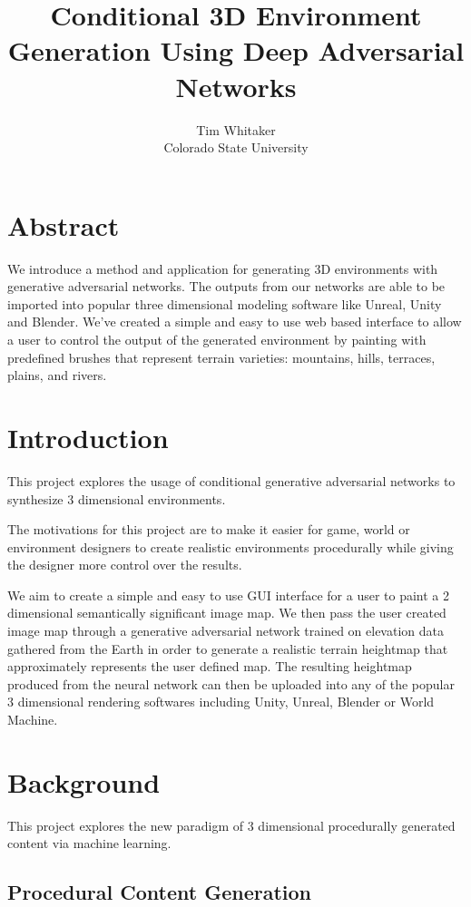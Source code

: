 \documentclass[twocolumn]{article}
\title{Conditional 3D Environment Generation Using Deep Adversarial Networks}
\author{Tim Whitaker \\ Colorado State University}
\begin{document}
	\maketitle
	
	\section{Abstract}
	
	We introduce a method and application for generating 3D environments with generative adversarial networks. The outputs from our networks are able to be imported into popular three dimensional modeling software like Unreal, Unity and Blender. We've created a simple and easy to use web based interface to allow a user to control the output of the generated environment by painting with predefined brushes that represent terrain varieties: mountains, hills, terraces, plains, and rivers.
	
	\section{Introduction}

	This project explores the usage of conditional generative adversarial networks to synthesize 3 dimensional environments.
	
	The motivations for this project are to make it easier for game, world or environment designers to create realistic environments procedurally while giving the designer more control over the results.
	
	We aim to create a simple and easy to use GUI interface for a user to paint a 2 dimensional semantically significant image map. We then pass the user created image map through a generative adversarial network trained on elevation data gathered from the Earth in order to generate a realistic terrain heightmap that approximately represents the user defined map. The resulting heightmap produced from the neural network can then be uploaded into any of the popular 3 dimensional rendering softwares including Unity, Unreal, Blender or World Machine.
	
	\section{Background}
	
	This project explores the new paradigm of 3 dimensional procedurally generated content via machine learning.
		
	\subsection{Procedural Content Generation}
	
\end{document}
